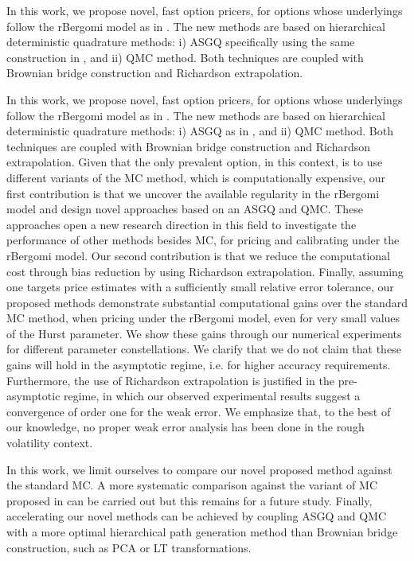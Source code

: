 In this work,  we propose  novel, fast option pricers,  for options whose underlyings  follow the rBergomi model as in \cite{bayer2016pricing}.  The new methods  are based on hierarchical deterministic quadrature methods:  i) ASGQ specifically using the same construction in \cite{haji2016multi}, and ii) QMC method. Both techniques are coupled with Brownian bridge construction and Richardson extrapolation.

In this work,  we propose  novel, fast option pricers,  for options whose underlyings  follow the rBergomi model as in \cite{bayer2016pricing}.  The new methods  are based on hierarchical deterministic quadrature methods:  i) ASGQ as in \cite{haji2016multi}, and ii) QMC method. Both techniques are coupled with Brownian bridge construction and Richardson extrapolation.
Given that the only prevalent option, in this context, is to use different variants of the MC method, which is computationally expensive, our first contribution  is that we uncover the available regularity in the rBergomi model and  design novel  approaches based on an ASGQ and QMC. These approaches  open a new research direction in this field to investigate the performance of other methods besides MC, for pricing and calibrating under the rBergomi model. Our second contribution is that we reduce the computational cost  through bias reduction by using Richardson extrapolation. Finally, assuming one targets price estimates with a sufficiently small relative error tolerance, our proposed methods demonstrate substantial computational gains  over the standard MC method, when pricing under the rBergomi model, even for very small values of the Hurst parameter. We show  these gains through our numerical experiments for  different parameter constellations.  We clarify that we do not claim that these gains will hold in the asymptotic regime, i.e.  for higher accuracy requirements. Furthermore, the use of Richardson extrapolation is justified in the pre-asymptotic regime, in which our observed experimental results suggest a convergence of order one for the weak error. We emphasize that, to the best of our knowledge, no proper weak error analysis has been done in the rough volatility context. 

In this work, we limit ourselves to compare our novel proposed method against the standard MC. A more systematic comparison against the variant of MC proposed in \cite{mccrickerd2018turbocharging}  can be carried out but this remains for a future study. Finally, accelerating  our novel  methods can be achieved  by coupling ASGQ and QMC with a more optimal hierarchical path generation method than Brownian bridge construction, such as PCA or LT transformations.